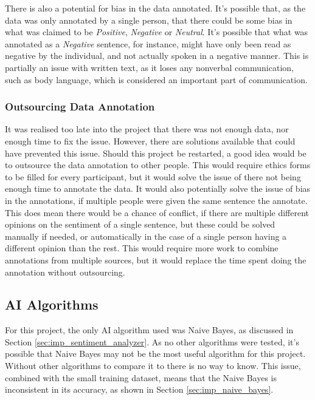 There is also a potential for bias in the data annotated. It's possible that, as the data was only annotated by a single person, that there could be some bias in what was claimed to be \emph{Positive}, \emph{Negative} or \emph{Neutral}. It's possible that what was annotated as a \emph{Negative} sentence, for instance, might have only been read as negative by the individual, and not actually spoken in a negative manner. This is partially an issue with written text, as it loses any nonverbal communication, such as body language, which is considered an important part of communication\cite{Whaley2007}.

\subsubsection{Outsourcing Data Annotation}

It was realised too late into the project that there was not enough data, nor enough time to fix the issue. However, there are solutions available that could have prevented this issue. Should this project be restarted, a good idea would be to outsource the data annotation to other people. This would require ethics forms to be filled for every participant, but it would solve the issue of there not being enough time to annotate the data. It would also potentially solve the issue of bias in the annotations, if multiple people were given the same sentence the annotate. This does mean there would be a chance of conflict, if there are multiple different opinions on the sentiment of a single sentence, but these could be solved manually if needed, or automatically in the case of a single person having a different opinion than the rest. This would require more work to combine annotations from multiple sources, but it would replace the time spent doing the annotation without outsourcing.

\subsection{AI Algorithms}

For this project, the only AI algorithm used was Naive Bayes, as discussed in Section \ref{sec:imp_sentiment_analyzer}. As no other algorithms were tested, it's possible that Naive Bayes may not be the most useful algorithm for this project. Without other algorithms to compare it to there is no way to know. This issue, combined with the small training dataset, means that the Naive Bayes is inconsistent in its accuracy, as shown in Section \ref{sec:imp_naive_bayes}.

